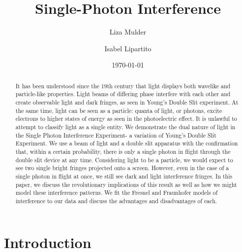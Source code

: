 \documentclass[prb,preprint]{revtex4-1}
\begin{document}

\title{Single-Photon Interference}


\author{Liza Mulder}


\author{Isabel Lipartito}


\date{\today}



\begin{abstract}

It has been understood since the 19th century that light displays both wavelike and particle-like properties.  Light beams of differing phase interfere with each other and create observable light and dark fringes, as seen in Young's Double Slit experiment.  At the same time, light can be seen as a particle:  quanta of light, or photons, excite electrons to higher states of energy as seen in the photoelectric effect.  It is unlawful to attempt to classify light as a single entity.  We demonstrate the dual nature of light in the Single Photon Interference Experiment- a variation of Young's Double Slit Experiment.  We use a beam of light and a double slit apparatus with the confirmation that, within a certain probability, there is only a single photon in flight through the double slit device at any time.  Considering light to be a particle, we would expect to see two single bright fringes projected onto a screen.  However, even in the case of a single photon in flight at once, we still see dark and light interference fringes.  In this paper, we discuss the revolutionary implications of this result as well as how we might model these interference patterns.  We fit the Fresnel and Fraunhofer models of interference to our data and discuss the advantages and disadvantages of each.

\end{abstract}

\maketitle %


\section{Introduction} %
\end{document}
